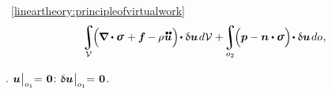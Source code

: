 \vspace{-0.2em}\noindent
{} ~\eqref{lineartheory:principleofvirtualwork}
\begin{equation*}
\displaystyle\integral\displaylimits_{\mathcal{V}} \hspace{-0.4ex} \Bigl( \hspace{-0.1ex} \boldnabla \dotp \linearstress \hspace{.1ex} + \bm{f} \hspace{-0.1ex} - \hspace{-0.1ex} \rho \hspace{.1ex} \mathdotdotabove{\bm{u}} \hspace{.1ex} \Bigr) \hspace{-0.3ex} \dotp \variation{\bm{u}} \hspace{.25ex} d\mathcal{V}
+ \hspace{-0.3ex}
\displaystyle\integral\displaylimits_{o_2} \hspace{-0.4ex} \Bigl( \bm{p} - \unitnormalvector \dotp \linearstress \Bigr) \hspace{-0.3ex} \dotp \variation{\bm{u}} \hspace{.25ex} do
\hspace{.1ex} ,
\end{equation*}

\vspace{-0.4em}\noindent
{}
.
${\bm{u} \hspace{.1ex} \bigr|_{o_1} \hspace{-0.64ex} = \hspace{.2ex} {\bm{0}}}$:
${ \updelta\hspace{-0.1ex}\bm{u} \hspace{.1ex} \bigr|_{o_1} \hspace{-0.64ex} = \hspace{.2ex} {\bm{0}} }$.
